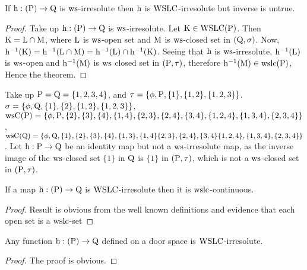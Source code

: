 \begin{thm}\label{thm7.4.1}
If $\mathrm{h}: (\mathrm{P}) \to \mathrm{Q}$ is $\mathrm{ws}$-irresolute then $\mathrm{h}$ is $\mathrm{WSLC}$-irresolute but inverse is untrue.
\end{thm}

\begin{proof}
Take up $\mathrm{h} : (\mathrm{P}) \to \mathrm{Q}$ is $\mathrm{ws}$-irresolute. Let $\mathrm{K} \in \mathrm{WSLC}(\mathrm{P})$. Then $\mathrm{K} = \mathrm{L} \cap \mathrm{M}$, where $\mathrm{L}$ is $\mathrm{ws}$-open set and $\mathrm{M}$ is $\mathrm{ws}$-closed set in $(\mathrm{Q}, \sigma)$. Now, $\mathrm{h}^{-1} (\mathrm{K}) = \mathrm{h}^{-1} (\mathrm{L} \cap \mathrm{M}) = \mathrm{h}^{-1} (\mathrm{L}) \cap \mathrm{h}^{-1} (\mathrm{K})$. Seeing that $\mathrm{h}$ is $\mathrm{ws}$-irresolute, $\mathrm{h}^{-1}(\mathrm{L})$ is $\mathrm{ws}$-open and $\mathrm{h}^{-1}(\mathrm{M})$ is $\mathrm{ws}$ closed set in $(\mathrm{P}, \tau)$, therefore $\mathrm{h}^{-1}(\mathrm{M})\in \mathrm{ws}\mathrm{lc}(\mathrm{P})$, Hence the theorem.
\end{proof}

\begin{exm}\label{exam7.4.2}
Take up $\mathrm{P} = \mathrm{Q} = \{1, 2, 3, 4\}$, and $\tau= \{\phi, \mathrm{P}, \{1\}, \{1, 2\}, \{1, 2, 3\}\}$. $\sigma = \{\phi, \mathrm{Q}, \{1\}, \{2\}, \{1, 2\}, \{1, 2, 3\}\}$, $\ws\TSC(\TSP) = \{\phi, \TSP, \{2\}, \{3\}, \{4\}, \{1, 4\}, \{2,3\},\break \{2,4\},\{3,4\}, \{1,2, 4\},\{1,3,4\},\{2,3,4\}\}$, $\ws\TSC(\TSQ) = \{\phi, \TSQ,\{1\}, \{2\}, \{3\}, \{4\}, \{1, 3\},\break \{1, 4\} \{2,3\}, \{2,4\}, \{3,4\}\{1,2, 4\},\{1,3,4\},\{2,3,4\}\}$. Let $\mathrm{h} : \mathrm{P} \to \mathrm{Q}$ be an identity map but not a $\mathrm{ws}$-irresolute map, as the inverse image of the $\mathrm{ws}$-closed set $\{1\}$ in $\mathrm{Q}$ is $\{1\}$ in $(\mathrm{P}, \tau)$, which is not a $\mathrm{ws}$-closed set in $(\mathrm{P}, \tau)$.
\end{exm}

\begin{thm}\label{thm7.4.2}
If a map $\mathrm{h}: (\mathrm{P}) \to \mathrm{Q}$ is $\mathrm{WSLC}$-irresolute then it is $\mathrm{ws}\mathrm{lc}$-continuous.
\end{thm}

\begin{proof}
Result is obvious from the well known definitions and evidence that each open set is a $\mathrm{ws}\mathrm{lc}$-set
\end{proof}

\begin{thm}\label{thm7.4.3}
Any function $\mathrm{h} : (\mathrm{P}) \to \mathrm{Q}$ defined on a door space is $\mathrm{WSLC}$-irresolute.
\end{thm}

\begin{proof}
The proof is obvious.
\end{proof}

